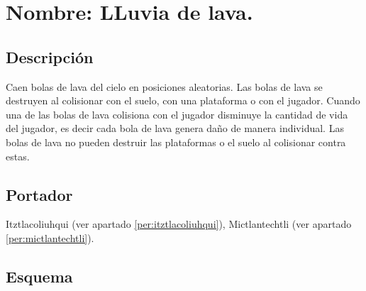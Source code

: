 \section{Nombre: LLuvia de lava.} \label{hab.LLuviaLava}
\subsection{Descripción}
Caen bolas de lava del cielo en posiciones aleatorias. Las bolas de lava se destruyen al colisionar con el suelo, con una plataforma o con el jugador. Cuando una de las bolas de lava colisiona con el jugador disminuye la cantidad de vida del jugador, es decir cada bola de lava genera daño de manera individual. Las bolas de lava no pueden destruir las plataformas o el suelo al colisionar contra estas.
\subsection{Portador}
Itztlacoliuhqui (ver apartado \ref{per:itztlacoliuhqui}), Mictlantechtli (ver apartado \ref{per:mictlantechtli}).	
\subsection{Esquema}	
			